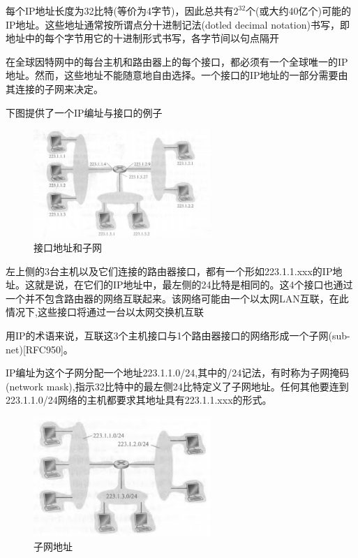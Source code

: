     每个IP地址长度为32比特(等价为4字节)，因此总共有$2^{32}$个(或大约40亿个)可能的IP地址。这些地址通常按所谓点分十进制记法(dotled decimal notation)书写，即地址中的每个字节用它的十进制形式书写，各字节间以句点隔开

    在全球因特网中的每台主机和路由器上的每个接口，都必须有一个全球唯一的IP地址。然而，这些地址不能随意地自由选择。一个接口的IP地址的一部分需要由其连接的子网来决定。

    下图提供了一个IP编址与接口的例子

\begin{figure}[!htbp]
    \centering
    \includegraphics[width=0.6\textwidth]{image/chapter04/接口地址和子网.png}
    \caption{接口地址和子网}
\end{figure}

    左上侧的3台主机以及它们连接的路由器接口，都有一个形如223.1.1.xxx的IP地址。这就是说，在它们的IP地址中，最左侧的24比特是相同的。这4个接口也通过一个并不包含路由器的网络互联起来。该网络可能由一个以太网LAN互联，在此情况下,这些接口将通过一台以太网交换机互联

    用IP的术语来说，互联这3个主机接口与1个路由器接口的网络形成一个子网(sub-net)[RFC950]。

    IP编址为这个子网分配一个地址223.1.1.0/24,其中的/24记法，有时称为子网掩码(network mask),指示32比特中的最左侧24比特定义了子网地址。任何其他要连到223.1.1.0/24网络的主机都要求其地址具有223.1.1.xxx的形式。

\begin{figure}[!htbp]
    \centering
    \includegraphics[width=0.6\textwidth]{image/chapter04/子网地址.png}
    \caption{子网地址}
\end{figure}

